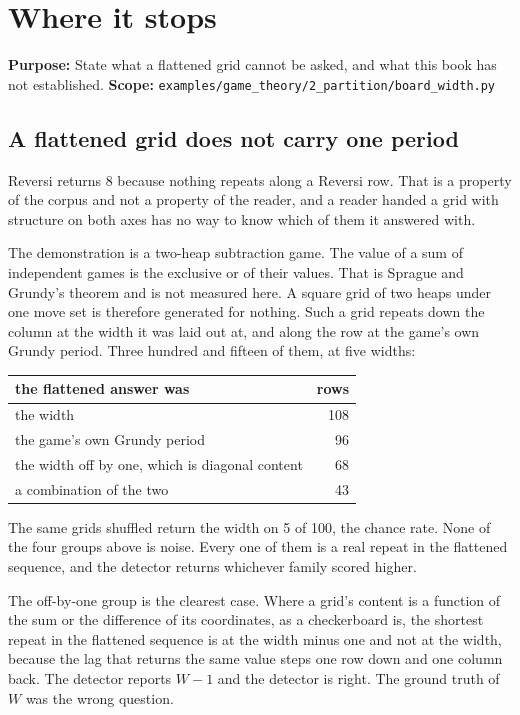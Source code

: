 \chapter{Where it stops}

\textbf{Purpose:} State what a flattened grid cannot be asked, and what this book has not
established. \textbf{Scope:}
\texttt{examples/\allowbreak{}game\_\allowbreak{}theory/\allowbreak{}2\_\allowbreak{}partition/\allowbreak{}board\_\allowbreak{}width.\allowbreak{}py}

\section{A flattened grid does not carry one period}

Reversi returns 8 because nothing repeats along a Reversi row. That is a property of the corpus and
not a property of the reader, and a reader handed a grid with structure on both axes has no way to
know which of them it answered with.

The demonstration is a two-heap subtraction game. The value of a sum of independent games is the
exclusive or of their values. That is Sprague and Grundy's theorem and is not measured here. A square
grid of two heaps under one move set is therefore generated for nothing. Such a grid repeats down the column at the
width it was laid out at, and along the row at the game's own Grundy period. Three hundred and
fifteen of them, at five widths:

\begin{center}
\begin{tabular}{@{}lr@{}}
\toprule
the flattened answer was & rows \\
\midrule
the width & 108 \\
the game's own Grundy period & 96 \\
the width off by one, which is diagonal content & 68 \\
a combination of the two & 43 \\
\bottomrule
\end{tabular}
\end{center}

The same grids shuffled return the width on 5 of 100, the chance rate. None of the four groups above
is noise. Every one of them is a real repeat in the flattened sequence, and the detector
returns whichever family scored higher.

The off-by-one group is the clearest case. Where a grid's content is a function of the sum or the
difference of its coordinates, as a checkerboard is, the shortest repeat in the flattened sequence is
at the width minus one and not at the width, because the lag that returns the same value steps one
row down and one column back. The detector reports \(W-1\) and the detector is right. The ground
truth of \(W\) was the wrong question.

